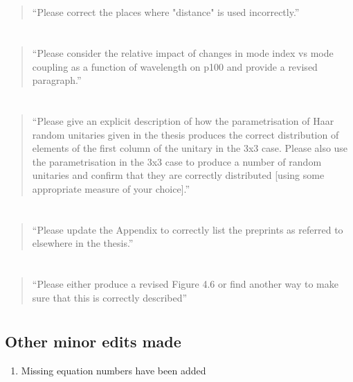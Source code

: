 \documentclass[a4paper,11pt]{article}
\begin{document}
\section{}
\begin{quote}
  ``Please correct the places where "distance" is used incorrectly.''
\end{quote}

\section{}
\begin{quote}
  ``Please consider the relative impact of changes in mode index vs
  mode coupling as a function of wavelength on p100 and provide a
  revised paragraph.''
\end{quote}

\section{}
\begin{quote}
  ``Please give an explicit description of how the parametrisation of
  Haar random unitaries given in the thesis produces the correct
  distribution of elements of the first column of the unitary in the 3x3
  case.  Please also use the parametrisation in the 3x3 case to produce
  a number of random unitaries and confirm that they are correctly
  distributed [using some appropriate measure of your choice].''
\end{quote}

\section{}
\begin{quote}
  ``Please update the Appendix to correctly list the preprints as
  referred to elsewhere in the thesis.''
\end{quote}

\section{}
\begin{quote}
  ``Please either produce a revised Figure 4.6 or find another way to
  make sure that this is correctly described''
\end{quote}

\section{}
\subsection*{Other minor edits made}
\begin{enumerate}
  \item Missing equation numbers have been added
\end{enumerate}
\end{document}
